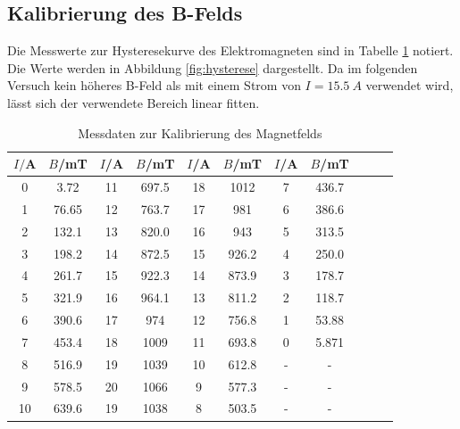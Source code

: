\subsection{Kalibrierung des B-Felds}
Die Messwerte zur Hysteresekurve des Elektromagneten sind in Tabelle \ref{tab:hysterese} notiert.
Die Werte werden in Abbildung \ref{fig:hysterese} dargestellt.
Da im folgenden Versuch kein höheres B-Feld als mit einem Strom von $I=\SI{15.5}{A}$ verwendet wird, lässt sich der verwendete Bereich linear fitten.
%
%
\begin{table}[h!]
  \centering
  \caption{Messdaten zur Kalibrierung des Magnetfelds}
  \label{tab:hysterese}
  \begin{tabular}{c c c c c c c c c c c}
    \toprule
      $I/$A   &   $B$/mT  &  $I$/A   & $B$/mT &  $I$/A   & $B$/mT &  $I$/A   & $B$/mT\\
      \midrule
      0     &   3.72    &   11    &   697.5   &    18    &   1012      &    7     &   436.7    \\
      1     &   76.65   &   12    &   763.7   &    17    &   981       &    6     &   386.6    \\
      2     &   132.1   &   13    &   820.0   &    16    &   943       &    5     &   313.5    \\
      3     &   198.2   &   14    &   872.5   &    15    &   926.2     &    4     &   250.0    \\
      4     &   261.7   &   15    &   922.3   &    14    &   873.9     &    3     &   178.7    \\
      5     &   321.9   &   16    &   964.1   &    13    &   811.2     &    2     &   118.7    \\
      6     &   390.6   &   17    &   974     &    12    &   756.8     &    1     &   53.88    \\
      7     &   453.4   &   18    &   1009    &    11    &   693.8     &    0     &   5.871    \\
      8     &   516.9   &   19    &   1039    &    10    &   612.8     &    -     &      -     \\
      9     &   578.5   &   20    &   1066    &    9     &   577.3     &    -     &      -     \\
      10    &   639.6   &   19    &   1038    &    8     &   503.5     &    -     &      -     \\
    \bottomrule
  \end{tabular}
\end{table}
